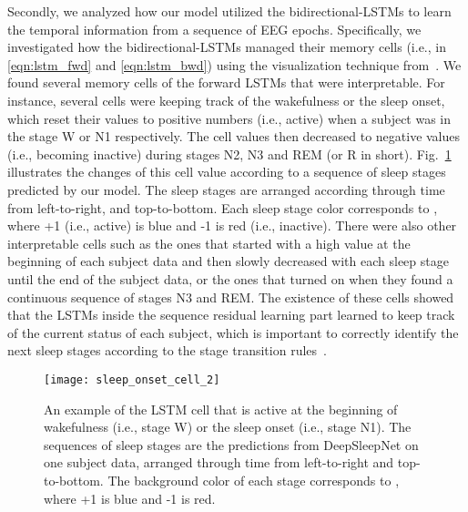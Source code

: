 \documentclass[journal,twoside]{IEEEtran}
\let\MYoriglatexcaption\caption
\renewcommand{\caption}[2][\relax]{\MYoriglatexcaption[#2]{#2}}
\begin{document}
Secondly, we analyzed how our model utilized the bidirectional-LSTMs to learn the temporal information from a sequence of EEG epochs. Specifically, we investigated how the bidirectional-LSTMs managed their memory cells (i.e.,  in \eqref{eqn:lstm_fwd} and \eqref{eqn:lstm_bwd}) using the visualization technique from~\cite{karpathy2015}.  We found several memory cells of the forward LSTMs that were interpretable. For instance, several cells were keeping track of the wakefulness or the sleep onset, which reset their values to positive numbers (i.e., active) when a subject was in the stage W or N1 respectively. The cell values then decreased to negative values (i.e., becoming inactive) during stages N2, N3 and REM (or R in short). Fig.~\ref{fig:sleep_onset_cell} illustrates the changes of this cell value according to a sequence of sleep stages predicted by our model. The sleep stages are arranged according through time from left-to-right, and top-to-bottom. Each sleep stage color corresponds to , where +1 (i.e., active) is blue and -1 is red (i.e., inactive). There were also other interpretable cells such as the ones that started with a high value at the beginning of each subject data and then slowly decreased with each sleep stage until the end of the subject data, or the ones that turned on when they found a continuous sequence of stages N3 and REM. The existence of these cells showed that the LSTMs inside the sequence residual learning part learned to keep track of the current status of each subject, which is important to correctly identify the next sleep stages according to the stage transition rules~\cite{iber2007}.

\begin{figure}[!t]
\centering
\texttt{[image: sleep\_onset\_cell\_2]}
\caption{An example of the LSTM cell that is active at the beginning of wakefulness (i.e., stage W) or the sleep onset (i.e., stage N1). The sequences of sleep stages are the predictions from DeepSleepNet on one subject data, arranged through time from left-to-right and top-to-bottom. The background color of each stage corresponds to , where +1 is blue and -1 is red.}
\label{fig:sleep_onset_cell}
\end{figure}
\end{document}
